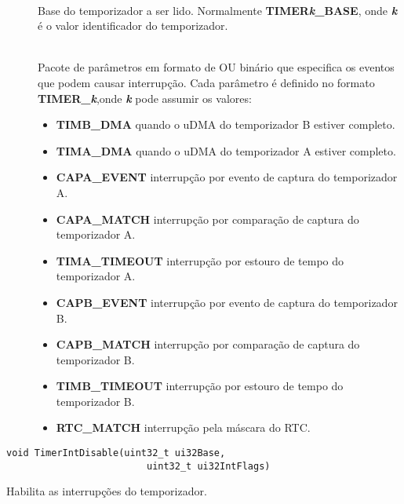 \begin{description}
	\item []\hfill \\
	Base do temporizador a ser lido. Normalmente \textbf{TIMER\emph{k}\_BASE}, onde \textbf{\emph{k}} é o valor identificador do temporizador.
	
	\item []\hfill \\
	Pacote de parâmetros em formato de OU binário que especifica os eventos que podem causar interrupção. Cada parâmetro é definido no formato \textbf{TIMER\_\emph{k}},onde \textbf{\emph{k}} pode assumir os valores:
	\begin{itemize}
		\item \textbf{TIMB\_DMA} quando o uDMA do temporizador B estiver completo.
		\item \textbf{TIMA\_DMA} quando o uDMA do temporizador A estiver completo.
		\item \textbf{CAPA\_EVENT} interrupção por evento de captura do temporizador A.
		\item \textbf{CAPA\_MATCH} interrupção por comparação de captura do temporizador A.
		\item \textbf{TIMA\_TIMEOUT} interrupção por estouro de tempo do temporizador A.
		\item \textbf{CAPB\_EVENT} interrupção por evento de captura do temporizador B.
		\item \textbf{CAPB\_MATCH} interrupção por comparação de captura do temporizador B.
		\item \textbf{TIMB\_TIMEOUT} interrupção por estouro de tempo do temporizador B.
		\item \textbf{RTC\_MATCH} interrupção pela máscara do RTC.
	\end{itemize}
\end{description}

\begin{lstlisting}[style=funcao]
	void TimerIntDisable(uint32_t ui32Base,
						 uint32_t ui32IntFlags)
\end{lstlisting}

Habilita as interrupções do temporizador.

